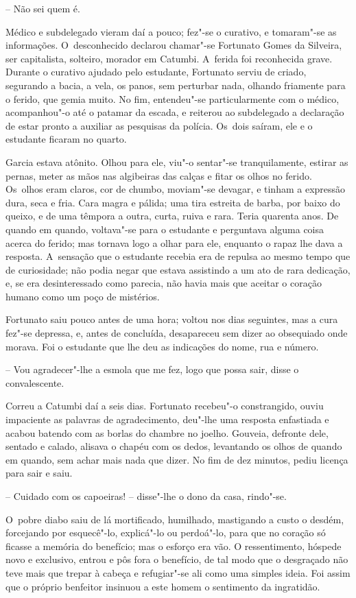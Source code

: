 -- Não sei quem é.

Médico e subdelegado vieram daí a pouco; fez"-se o curativo, e tomaram"-se
as informações. O~desconhecido declarou chamar"-se Fortunato Gomes da
Silveira, ser capitalista, solteiro, morador em Catumbi. A~ferida foi
reconhecida grave. Durante o curativo ajudado pelo estudante, Fortunato
serviu de criado, segurando a bacia, a vela, os panos, sem perturbar
nada, olhando friamente para o ferido, que gemia muito. No fim,
entendeu"-se particularmente com o médico, acompanhou"-o até o patamar da
escada, e reiterou ao subdelegado a declaração de estar pronto a
auxiliar as pesquisas da polícia. Os~dois saíram, ele e o estudante
ficaram no quarto.

Garcia estava atônito. Olhou para ele, viu"-o sentar"-se tranquilamente,
estirar as pernas, meter as mãos nas algibeiras das calças e fitar os
olhos no ferido. Os~olhos eram claros, cor de chumbo, moviam"-se devagar,
e tinham a expressão dura, seca e fria. Cara magra e pálida; uma tira
estreita de barba, por baixo do queixo, e de uma têmpora a outra, curta,
ruiva e rara. Teria quarenta anos. De quando em quando, voltava"-se para
o estudante e perguntava alguma coisa acerca do ferido; mas tornava logo
a olhar para ele, enquanto o rapaz lhe dava a resposta. A~sensação que o
estudante recebia era de repulsa ao mesmo tempo que de curiosidade; não
podia negar que estava assistindo a um ato de rara dedicação, e, se era
desinteressado como parecia, não havia mais que aceitar o coração humano
como um poço de mistérios.

Fortunato saiu pouco antes de uma hora; voltou nos dias seguintes, mas a
cura fez"-se depressa, e, antes de concluída, desapareceu sem dizer ao
obsequiado onde morava. Foi o estudante que lhe deu as indicações do
nome, rua e número.

-- Vou agradecer"-lhe a esmola que me fez, logo que possa sair, disse o
convalescente.

Correu a Catumbi daí a seis dias. Fortunato recebeu"-o constrangido,
ouviu impaciente as palavras de agradecimento, deu"-lhe uma resposta
enfastiada e acabou batendo com as borlas do chambre no joelho. Gouveia,
defronte dele, sentado e calado, alisava o chapéu com os dedos,
levantando os olhos de quando em quando, sem achar mais nada que dizer.
No fim de dez minutos, pediu licença para sair e saiu.

-- Cuidado com os capoeiras! -- disse"-lhe o dono da casa, rindo"-se.

O~pobre diabo saiu de lá mortificado, humilhado, mastigando a custo o
desdém, forcejando por esquecê"-lo, explicá"-lo ou perdoá"-lo, para que no
coração só ficasse a memória do benefício; mas o esforço era vão. O
ressentimento, hóspede novo e exclusivo, entrou e pôs fora o benefício,
de tal modo que o desgraçado não teve mais que trepar à cabeça e
refugiar"-se ali como uma simples ideia. Foi assim que o próprio
benfeitor insinuou a este homem o sentimento da ingratidão.

